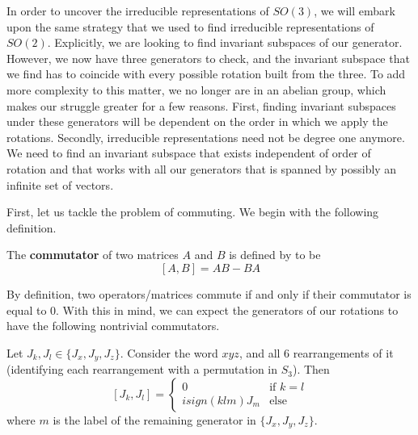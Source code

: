 In order to uncover the irreducible representations of $SO(3)$, we will embark upon the same strategy that we used to find irreducible representations of $SO(2)$. Explicitly, we are looking to find invariant subspaces of our generator. However, we now have three generators to check, and the invariant subspace that we find has to coincide with every possible rotation built from the three. To add more complexity to this matter, we no longer are in an abelian group, which makes our struggle greater for a few reasons. First, finding invariant subspaces under these generators will be dependent on the order in which we apply the rotations. Secondly, irreducible representations need not be degree one anymore. We need to find an invariant subspace that exists independent of order of rotation and that works with all our generators that is spanned by possibly an infinite set of vectors.

First, let us tackle the problem of commuting. We begin with the following definition.

\begin{definition}
	The \textbf{commutator} of two matrices $A$ and $B$ is defined by to be 
$$[A,B]=AB-BA$$
\end{definition}

By definition, two operators/matrices commute if and only if their commutator is equal to $0$. With this in mind, we can expect the generators of our rotations to have the following nontrivial commutators.

\begin{theorem}
	Let $J_k,J_l \in \{J_x,J_y,J_z\}$. Consider the word $xyz$, and all 6 rearrangements of it (identifying each rearrangement with a permutation in $S_3$). Then 
$$[J_k , J_l] = \begin{cases}
					0 & \text{if }k = l \\
					isign(klm)J_m& \text{else}
					\end{cases}$$
where $m$ is the label of the remaining generator in $\{J_x,J_y,J_z\}$.
\end{theorem}

